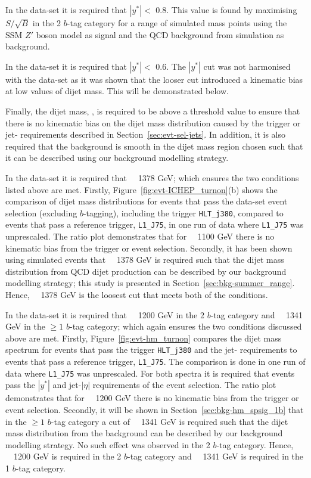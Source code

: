 In the \hm{} data-set it is required that $|y^*| <$ 0.8.
This value is found by maximising $S/\sqrt{B}$ in the 2 $b$-tag category for a range of simulated mass points
using the SSM $Z'$ boson model as signal and the QCD background from simulation as background.

In the \lm{} data-set it is required that $|y^*| <$ 0.6.
The $|y^*|$ cut was not harmonised with the \hm{} data-set
as it was shown that the looser cut introduced a kinematic bias at low values of dijet mass.
This will be demonstrated below.

Finally, the dijet mass, \mjj{}, is required to be above a threshold value
to ensure that there is no kinematic bias on the dijet mass distribution
caused by the trigger or jet-\pT{} requirements described in Section~\ref{sec:evt-sel-jets}.
In addition, it is also required that the background is smooth in the dijet mass region chosen
such that it can be described using our background modelling strategy.

In the \summer{} data-set it is required that \mjj~\gt~1378 GeV;
which ensures the two conditions listed above are met.
Firstly, Figure~\ref{fig:evt-ICHEP_turnon}(b) shows the comparison of dijet mass distributions for events
that pass the \summer{} data-set event selection (excluding $b$-tagging), including the trigger \verb|HLT_j380|,
compared to events that pass a reference trigger, \verb|L1_J75|,
in one run of data where \verb|L1_J75| was unprescaled.
The ratio plot demonstrates that for \mjj~\gt~1100 GeV there is no kinematic bias from the trigger or event selection.
Secondly, it has been shown using simulated events that
\mjj~\gt~1378 GeV is required such that the dijet mass distribution from QCD dijet production
can be described by our background modelling strategy;
this study is presented in Section~\ref{sec:bkg-summer_range}.
Hence, \mjj~\gt~1378 GeV is the loosest cut that meets both of the conditions.

In the \hm{} data-set it is required that \mjj~\gt~1200 GeV in the 2 $b$-tag category and
\mjj~\gt~1341 GeV in the $\geq1$ $b$-tag category;
which again ensures the two conditions discussed above are met.
Firstly, Figure~\ref{fig:evt-hm_turnon} compares the dijet mass spectrum
for events that pass the trigger \verb|HLT_j380| and the \hm{} jet-\pT{} requirements
to events that pass a reference trigger, \verb|L1_J75|.
The comparison is done in one run of data where \verb|L1_J75| was unprescaled.
For both spectra it is required that events pass the $|y^*|$ and jet-$|\eta|$ requirements of the \hm{} event selection.
The ratio plot demonstrates that for \mjj~\gt~1200 GeV there is no kinematic bias from the trigger or event selection.
Secondly, it will be shown in Section~\ref{sec:bkg-hm_spsig_1b}
that in the $\geq1$ $b$-tag category a cut of \mjj~\gt~1341 GeV is required such that the
dijet mass distribution from the background can be described by our background modelling strategy.
No such effect was observed in the 2 $b$-tag category.
Hence, \mjj~\gt~1200 GeV is required in the 2 $b$-tag category and
\mjj~\gt~1341 GeV is required in the 1 $b$-tag category.



